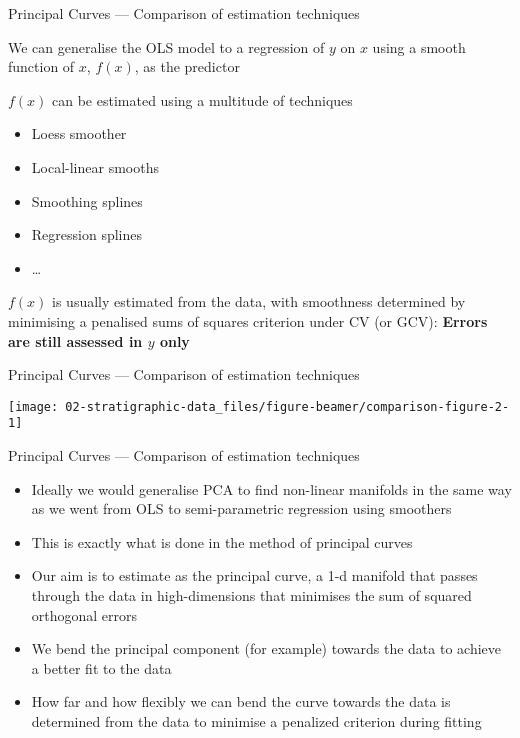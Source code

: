\documentclass[10pt,ignorenonframetext,compress, aspectratio=169]{beamer}
\providecommand{\tightlist}{%
  \setlength{\itemsep}{0pt}\setlength{\parskip}{0pt}}
\begin{document}
\begin{frame}{Principal Curves --- Comparison of estimation techniques}

We can generalise the OLS model to a regression of \(y\) on \(x\) using
a smooth function of \(x\), \(f(x)\), as the predictor

\(f(x)\) can be estimated using a multitude of techniques

\begin{itemize}
\tightlist
\item
  Loess smoother
\item
  Local-linear smooths
\item
  Smoothing splines
\item
  Regression splines
\item
  \ldots{}
\end{itemize}

\(f(x)\) is usually estimated from the data, with smoothness determined
by minimising a penalised sums of squares criterion under CV (or GCV):
\textbf{Errors are still assessed in \(y\) only}

\end{frame}

\begin{frame}{Principal Curves --- Comparison of estimation techniques}

\begin{center}\texttt{[image: 02-stratigraphic-data\_files/figure-beamer/comparison-figure-2-1]} \end{center}

\end{frame}

\begin{frame}{Principal Curves --- Comparison of estimation techniques}

\begin{itemize}
\tightlist
\item
  Ideally we would generalise PCA to find non-linear manifolds in the
  same way as we went from OLS to semi-parametric regression using
  smoothers
\item
  This is exactly what is done in the method of \alert{principal curves}
\item
  Our aim is to estimate as the principal curve, a 1-d manifold that
  passes through the data in high-dimensions that minimises the sum of
  squared orthogonal errors
\item
  We bend the principal component (for example) towards the data to
  achieve a better fit to the data
\item
  How far and how flexibly we can bend the curve towards the data is
  determined from the data to minimise a penalized criterion during
  fitting
\end{itemize}

\end{frame}
\end{document}
